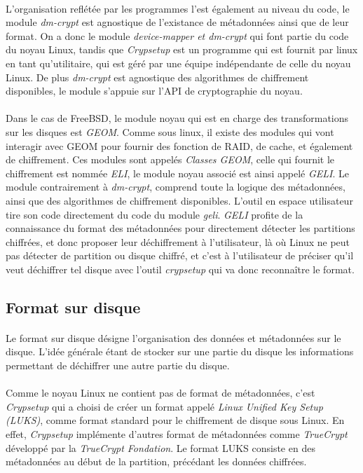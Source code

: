 \paragraph{}
L'organisation reflétée par les programmes l'est également au niveau du code,
le module {\em dm-crypt} est agnostique de l'existance de métadonnées ainsi 
que de leur format. On a donc le module {\em device-mapper \em et \em dm-crypt}
qui font partie du code du noyau Linux, tandis que {\em Crypsetup} est un 
programme qui est fournit par linux en tant qu'utilitaire, qui est géré par 
une équipe indépendante de celle du noyau Linux. De plus {\em dm-crypt} est 
agnostique des algorithmes de chiffrement disponibles, le module s'appuie sur 
l'API de cryptographie du noyau.

\paragraph{}
Dans le cas de FreeBSD, le module noyau qui est en charge des
transformations sur les disques est {\em GEOM}. Comme sous linux, il existe des
modules qui vont interagir avec GEOM pour fournir des fonction de RAID, de 
cache, et également de chiffrement. Ces modules sont appelés {\em Classes GEOM}, 
celle qui fournit le chiffrement est nommée {\em ELI}, le module noyau associé 
est ainsi appelé {\em GELI}. Le module contrairement à {\em dm-crypt}, 
comprend toute la logique des métadonnées, ainsi que des algorithmes de 
chiffrement disponibles. L'outil en espace utilisateur tire son code directement
 du code du module {\em geli}. {\em GELI} profite de la connaissance du format 
des métadonnées pour directement détecter les partitions chiffrées, et donc 
proposer leur déchiffrement à l'utilisateur, là où Linux ne peut pas détecter de
partition ou disque chiffré, et c'est à l'utilisateur de préciser qu'il veut 
déchiffrer tel disque avec l'outil {\em crypsetup} qui va donc reconnaître le 
format.


\subsection{Format sur disque}
\paragraph{}
Le format sur disque désigne l'organisation des données et métadonnées sur le 
disque. L'idée générale étant de stocker sur une partie du disque les 
informations permettant de déchiffrer une autre partie du disque.
\paragraph{}
Comme le noyau Linux ne contient pas de format de métadonnées, 
c'est {\em Crypsetup} qui a choisi de créer un format appelé {\em Linux 
Unified Key Setup (LUKS)}, comme format standard pour le chiffrement de disque 
sous Linux. En effet, {\em Crypsetup} implémente d'autres format de 
métadonnées comme {\em TrueCrypt} développé par la {\em TrueCrypt Fondation}. 
Le format LUKS consiste en des métadonnées au début de la partition, précédant 
les données chiffrées.

